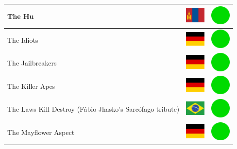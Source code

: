 \documentclass[12pt, a4paper, twoside]{report}
\begin{document}
\begin{center}
\begin{longtable}{|p{5cm}|p{2cm}|p{2cm}|}
 The Hu                                                     & \includegraphics[width=1cm]{../4x3/mn} &   \includegraphics[width=1cm]{../likes/y} \\ \hline
 The Idiots                                                 & \includegraphics[width=1cm]{../4x3/de} &   \includegraphics[width=1cm]{../likes/y} \\ \hline
 The Jailbreakers                                           & \includegraphics[width=1cm]{../4x3/de} &   \includegraphics[width=1cm]{../likes/y} \\ \hline
 The Killer Apes                                            & \includegraphics[width=1cm]{../4x3/de} &   \includegraphics[width=1cm]{../likes/y} \\ \hline
 The Laws Kill Destroy (Fábio Jhasko's Sarcófago tribute)   & \includegraphics[width=1cm]{../4x3/br} &   \includegraphics[width=1cm]{../likes/y} \\ \hline
 The Mayflower Aspect                                       & \includegraphics[width=1cm]{../4x3/de} &   \includegraphics[width=1cm]{../likes/y} \\ \hline

\end{longtable}
\end{center}
\end{document}
